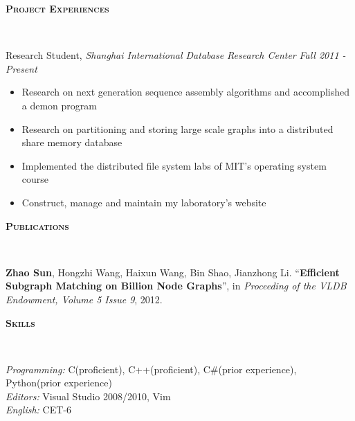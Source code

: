 \documentclass[9pt]{article}
\newenvironment{changemargin}[2]{%
  \begin{list}{}{%
    \setlength{\topsep}{0pt}%
    \setlength{\leftmargin}{#1}%
    \setlength{\rightmargin}{#2}%
    \setlength{\listparindent}{\parindent}%
    \setlength{\itemindent}{\parindent}%
    \setlength{\parsep}{\parskip}%
  }%
  \item[]}{\end{list}
}
\newcommand{\lineover}{
	\begin{changemargin}{-0.05in}{-0.05in}
		\vspace*{-8pt}
		\hrulefill \\
		\vspace*{-2pt}
	\end{changemargin}
}
\newcommand{\header}[1]{
	\begin{changemargin}{-0.5in}{-0.5in}
		\scshape{#1}\\
  	\lineover
	\end{changemargin}
}
\newenvironment{body} {
	\vspace*{-16pt}
	\begin{changemargin}{-0.25in}{-0.5in}
  }	
	{\end{changemargin}
}
\begin{document}
\smallskip


\header{\textbf{Project Experiences}}

\begin{body}
    \vspace{14pt}
    Research Student, \emph{Shanghai International Database Research Center} \hfill \emph{Fall 2011 - Present}
    \vspace*{-4pt}
    \begin{itemize} \itemsep -0pt
        \item Research on next generation sequence assembly algorithms and accomplished a demon program
        \item Research on partitioning and storing large scale graphs into a distributed share memory database
        \item Implemented the distributed file system labs of MIT's operating system course
        \item Construct, manage and maintain my laboratory's website
    \end{itemize}
\end{body}
\smallskip
\header{\textbf{Publications}}

\begin{body}
	\vspace{14pt}
	\textbf{Zhao Sun}, Hongzhi Wang, Haixun Wang, Bin Shao, Jianzhong Li. ``\textbf{Efficient Subgraph Matching on Billion Node Graphs}'', in \emph{Proceeding of the VLDB Endowment, Volume 5 Issue 9}, 2012.\\
\end{body}
\smallskip


\header{\textbf{Skills}}

\begin{body}
	\vspace{14pt}
	\emph{Programming:}{} C(proficient), C++(proficient), C\#(prior experience), Python(prior experience)\\
    \medskip
    \emph{Editors:}{} Visual Studio 2008/2010, Vim\\
    \medskip
    \emph{English:}{} CET-6
\end{body}
\smallskip
\end{document}
